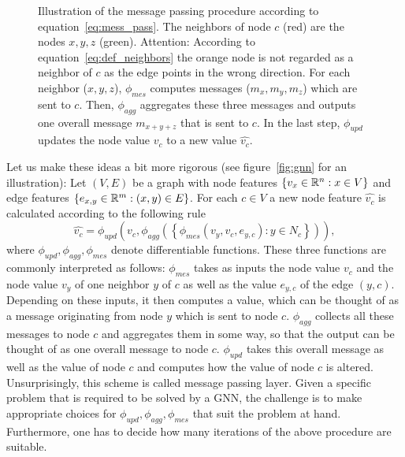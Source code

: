 \begin{SCfigure}[1][ht]
\caption{Illustration of the message passing procedure according to equation~\eqref{eq:mess_pass}. 
The neighbors of node $c$ (red) are the nodes $x,y,z$ (green). Attention: According to equation~\eqref{eq:def_neighbors} the orange node is not regarded as a neighbor of $c$ as the edge points in the wrong direction.
For each neighbor ($x,y,z$), $\phi_{mes}$ computes messages ($m_x,m_y,m_z$) which are sent to $c$.
Then, $\phi_{agg}$ aggregates these three messages and outputs one overall message $m_{x+y+z}$ that is sent to $c$. 
In the last step, $\phi_{upd}$ updates the node value $v_c$ to a new value $\widehat{v_c}$.  
}
\end{SCfigure}
Let us make these ideas a bit more rigorous (see figure~\ref{fig:gnn} for an illustration):  
Let $(V,E)$ be a graph with node features $\{v_x\in\mathbb{R}^n : x\in V\}$ and edge features $\{e_{x,y}\in\mathbb{R}^m:(x,y)\in E\}$.
For each $c\in V$ a new node feature $\widehat{v_c}$ is calculated according to the following rule
\begin{equation}
    \label{eq:mess_pass}
    \widehat{v_c}=\phi_{upd}\left(
        v_c, \phi_{agg}\left(\left\{
            \phi_{mes}\left(v_y,v_c, e_{y,c}\right):y\in N_c
            \right\}\right)
    \right),
\end{equation}
where $\phi_{upd},\phi_{agg},\phi_{mes}$ denote differentiable functions. These three functions are commonly interpreted as follows:
$\phi_{mes}$ takes as inputs the node value $v_c$ and the node value $v_y$ of one neighbor $y$ of $c$ as well as the value $e_{y,c}$ of the edge $(y,c)$. 
Depending on these inputs, it then computes a value, which can be thought of as a message originating from node $y$ which is sent to node $c$.
$\phi_{agg}$ collects all these messages to node $c$ and aggregates them in some way, so that the output can be thought of as one overall message to node $c$.
$\phi_{upd}$ takes this overall message as well as the value of node $c$ and computes how the value of node $c$ is altered.
Unsurprisingly, this scheme is called message passing layer. Given a specific problem that is required to be solved by a GNN, the challenge is to make appropriate choices
for $\phi_{upd},\phi_{agg},\phi_{mes}$ that suit the problem at hand. Furthermore, one has to decide how many iterations of the above procedure are suitable.